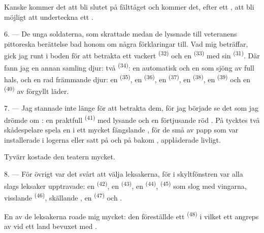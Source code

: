 Kanske kommer det att bli slutet på fälttåget och kommer det, efter ett
, att bli möjligt att underteckna ett .

\VUsaut{4.4mm}
\VUsaut{2.8mm}

6. --- De unga soldaterna, som skrattade medan de lyssnade till veteranens pittoreska
berättelse bad honom om några förklaringar till. Vad mig beträffar, gick jag runt i boden för
att betrakta ett vackert  \textsuperscript{(32)} och en 
\textsuperscript{(33)} med sin
 \textsuperscript{(31)}. Där fann jag en annan samling djur: två
 \textsuperscript{(34)}: en automatisk 
och en  som sjöng av full hals, och en rad främmande djur: en
 \textsuperscript{(35)}, en 
\textsuperscript{(36)}, en  \textsuperscript{(37)}, en
 \textsuperscript{(38)}, en  \textsuperscript{(39)} och
en  \textsuperscript{(40)} av förgyllt läder.

7. --- Jag stannade inte länge för att betrakta dem, för jag började se det som jag drömde om
: en praktfull  \textsuperscript{(41)} med lysande 
och en förtjusande röd . På
 tycktes två skådespelare spela en  i ett mycket
fängslande , för de små  av papp som var installerade i
logerna eller satt på  och på  bakom ,
applåderade livligt.

Tyvärr kostade den teatern mycket.

8. --- För övrigt var det svårt att välja leksakerna, för i skyltfönstren var alla slags
leksaker upptravade: en  \textsuperscript{(42)}, en
 \textsuperscript{(43)}, en 
\textsuperscript{(44)},  \textsuperscript{(45)} som slog med vingarna,
visslande  \textsuperscript{(46)}, skällande
, en  \textsuperscript{(47)} och
.


En av de leksakerna roade mig mycket: den föreställde ett 
\textsuperscript{(48)} i vilket ett  angreps av  vid ett land
bevuxet med .

